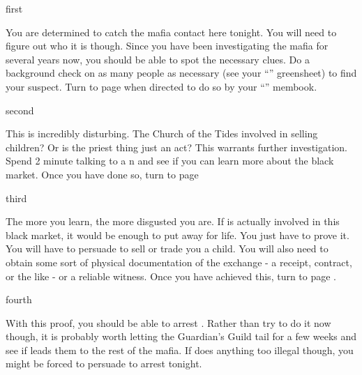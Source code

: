 \documentclass[greennotebook]{NeptuneBall}
\begin{document}

\startnotebook{\nMafia{}}

\begin{page}{first}

You are determined to catch the mafia contact here tonight. You will need to figure out who it is though. Since you have been investigating the mafia for several years now, you should be able to spot the necessary clues. Do a background check on as many people as necessary (see your ``\gBackground{\MYname}'' greensheet) to find your suspect. Turn to page  when directed to do so by your ``\nMafia{\MYname}'' membook.

\end{page}

\begin{page}{second}

This is incredibly disturbing. The Church of the Tides involved in selling children? Or is the priest thing just an act? This warrants further investigation. Spend 2 minute talking to a \pPacifica{}n and see if you can learn more about the black market. Once you have done so, turn to page 

\end{page}

\begin{page}{third}

The more you learn, the more disgusted you are. If \cPriest{} is actually involved in this black market, it would be enough to put \cPriest{\them} away for life. You just have to prove it. You will have to persuade \cPriest{} to sell or trade you a child. You will also need to obtain some sort of physical documentation of the exchange - a receipt, contract, or the like - or a reliable witness. Once you have achieved this, turn to page .

\end{page}

\begin{page}{fourth}

With this proof, you should be able to arrest \cPriest{}. Rather than try to do it now though, it is probably worth letting the Guardian's Guild tail \cPriest{\them} for a few weeks and see if \cPriest{} leads them to the rest of the mafia. If \cPriest{} does anything too illegal though, you might be forced to persuade \cKing{} to arrest \cPriest{} tonight.

\end{page}

\endnotebook
\end{document}
